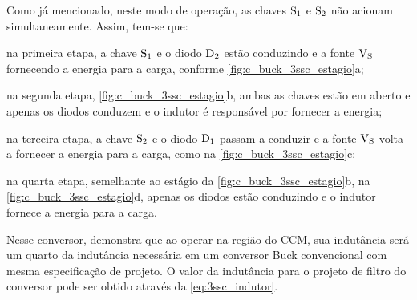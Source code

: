             
            Como já mencionado, neste modo de operação, as chaves $\text{S}_\text{1}$ e $\text{S}_\text{2}$ não acionam simultaneamente. Assim, tem-se que: 
            
            \begin{alineas}
                \item na primeira etapa, a chave $\text{S}_\text{1}$ e o diodo $\text{D}_\text{2}$ estão conduzindo e a fonte $\text{V}_\text{S}$ fornecendo a energia para a carga, conforme \autoref{fig:c_buck_3ssc_estagio}a;
                
                \item na segunda etapa, \autoref{fig:c_buck_3ssc_estagio}b, ambas as chaves estão em aberto e apenas os diodos conduzem e o indutor é responsável por fornecer a energia;
                
                \item na terceira etapa, a chave $\text{S}_\text{2}$ e o diodo $\text{D}_\text{1}$ passam a conduzir e a fonte $\text{V}_\text{S}$ volta a fornecer a energia para a carga, como na \autoref{fig:c_buck_3ssc_estagio}c;
                
                \item na quarta etapa, semelhante ao estágio da \autoref{fig:c_buck_3ssc_estagio}b, na \autoref{fig:c_buck_3ssc_estagio}d, apenas os diodos estão conduzindo e o indutor fornece a energia para a carga.
            \end{alineas}
            
            
            Nesse conversor,  demonstra que ao operar na região do CCM, sua indutância será um quarto da indutância necessária em um conversor Buck convencional com mesma especificação de projeto. O valor da indutância para o projeto de filtro do conversor pode ser obtido através da \autoref{eq:3ssc_indutor}.  
            
